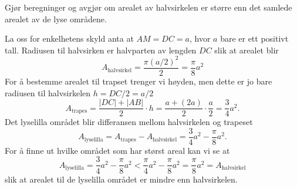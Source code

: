 \begin{figure}[H]
  \caption{}
  \label{fig:Forkurs-1p-2p-laererutdanning-2017-V-oppgave-1-5}
\end{figure}

\begin{oppgaver}
   Gjør beregninger og avgjør om arealet av halvsirkelen er større enn
    det samlede arealet av de lyse områdene.
\end{oppgaver}

\begin{losninger}
  La oss for enkelhetens skyld anta at $AM = DC = a$, hvor $a$ bare er ett
  positivt tall. Radiusen til halvsirken er halvparten av lengden $DC$ slik
  at arealet blir
  \begin{equation*}
    A_{\text{halvsirkel}}
    = \frac{\pi (a/2)^2}{2}
    = \frac{\pi}{8} a^2
  \end{equation*}
  For å bestemme arealet til trapset trenger vi høyden, men dette er jo bare
  radiusen til halvsirkelen $h = DC/2 = a/2$
  \begin{equation*}
    A_{\text{trapes}}
    = \frac{|DC| + |AB|}{2} \cdot h
    = \frac{a + (2a)}{2} \cdot \frac{a}{2}
    = \frac{3}{4}a^2.
  \end{equation*}
  Det lyselilla området blir differansen mellom halvsirkelen og trapeset
  \begin{equation*}
    A_{\text{lyselilla}}
    = A_{\text{trapes}} - A_{\text{halvsirkel}}
    = \frac{3}{4}a^2 - \frac{\pi}{8} a^2.
  \end{equation*}
  For å finne ut hvilke området som har størst areal kan vi se at
  \begin{equation*}
    A_{\text{lyselilla}}
    = \frac{3}{4}a^2 - \frac{\pi}{8} a^2
    < \frac{\pi}{4}a^2 - \frac{\pi}{8} a^2
    = \frac{\pi}{8} a^2
    =  A_{\text{halvsirkel}}
  \end{equation*}
  slik at arealet til de lyselilla området er mindre enn halvsirkelen.
\end{losninger}

